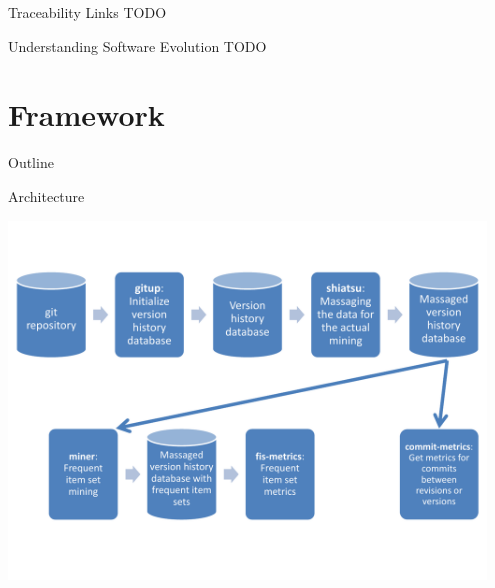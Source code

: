 \begin{frame}{Traceability Links}
  TODO
\end{frame}

\note{
}

\begin{frame}{Understanding Software Evolution}
  TODO
\end{frame}

\note{
}


\section{Framework}

\begin{frame}{Outline}
  \tableofcontents[current]
\end{frame}

\note{
}

\begin{frame}{Architecture}
  \begin{center}
    \includegraphics[width=0.95\textwidth]{figures/miner-architecture}
  \end{center}
\end{frame}

\note{
}

